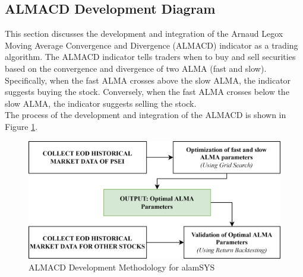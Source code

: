 \subsection{ALMACD Development Diagram}
\label{subsec:almacd_diagram}
This section discusses the development and integration of the
Arnaud Legox Moving Average Convergence and Divergence (ALMACD)
indicator as a trading algorithm. The ALMACD indicator tells
traders when to buy and sell securities based on the convergence
and divergence of two ALMA (fast and slow). Specifically, when
the fast ALMA crosses above the slow ALMA, the indicator suggests
buying the stock. Conversely, when the fast ALMA crosses below
the slow ALMA, the indicator suggests selling the stock.
\hfill \\

The process of the development and integration of the ALMACD
is shown in Figure \ref{fig:almacd_diagram}.

\begin{figure}[ht]
    \centering
    \includegraphics[width=1\textwidth]{./assets/Chapter_3/alamcd.png}
    \caption{ALMACD Development Methodology for alamSYS}
    \label{fig:almacd_diagram}
\end{figure}
\FloatBarrier

